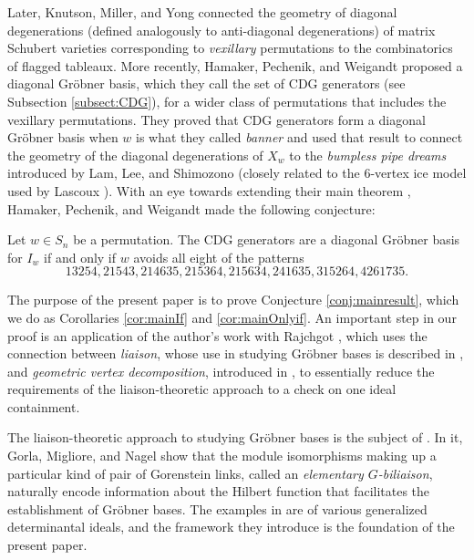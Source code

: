 \documentclass[ALCO,Unicode,published]{cedram}
\begin{document}
Later, Knutson, Miller, and Yong \cite{KMY09} connected the geometry of diagonal degenerations (defined analogously to anti-diagonal degenerations) of matrix Schubert varieties corresponding to \emph{vexillary} permutations to the combinatorics of flagged tableaux.  More recently, Hamaker, Pechenik, and Weigandt \cite{HPW}  proposed a diagonal Gr\"obner basis, which they call the set of CDG generators (see Subsection \ref{subsect:CDG}), for a wider class of permutations that includes the vexillary permutations.  They proved that CDG generators form a diagonal Gr\"obner basis when $w$ is what they called \emph{banner} and used that result to connect the geometry of the diagonal degenerations of $X_w$ to the \emph{bumpless pipe dreams} introduced by Lam, Lee, and Shimozono \cite{LLS} (closely related to the $6$-vertex ice model used by Lascoux \cite{Las, Wei, BS}).  With an eye towards extending their main theorem \cite[Theorem 6.4]{HPW}, Hamaker, Pechenik, and Weigandt made the following conjecture:

\begin{conjecture}\cite[Conjecture 7.1]{HPW}\label{conj:mainresult}
Let $w \in S_n$ be a permutation. The CDG generators are a diagonal Gr\"obner basis for $I_w$ if and only if $w$ avoids all eight of the patterns \[
13254, 21543, 214635, 215364, 215634, 241635, 315264, 4261735.
\]
\end{conjecture}

The purpose of the present paper is to prove Conjecture \ref{conj:mainresult}, which we do as Corollaries \ref{cor:mainIf} and \ref{cor:mainOnlyif}.  An important step in our proof is an application of the author's work with Rajchgot \cite[Corollary 4.13]{KR}, which uses the connection between \emph{liaison}, whose use in studying Gr\"obner bases is described in \cite{GMN13}, and \emph{geometric vertex decomposition}, introduced in \cite{KMY09}, to essentially reduce the requirements of the liaison-theoretic approach to a check on one ideal containment.  

The liaison-theoretic approach to studying Gr\"obner bases is the subject of \cite{GMN13}.  In it, Gorla, Migliore, and Nagel show that the module isomorphisms making up a particular kind of pair of Gorenstein links, called an \emph{elementary $G$-biliaison}, naturally encode information about the Hilbert function that facilitates the establishment of Gr\"obner bases.  The examples in \cite{GMN13} are of various generalized determinantal ideals, and the framework they introduce is the foundation of the present paper.  
\end{document}
